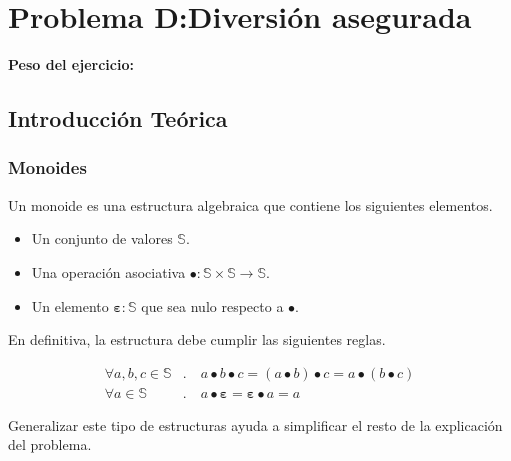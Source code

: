 \newpage{}
\section{Problema D:\@ Diversión asegurada}
\textbf{Peso del ejercicio: }

\newcommand{\mempty}{\mathbf{\varepsilon}}

\subsection{Introducción Teórica}

\subsubsection{Monoides}

Un monoide es una estructura algebraica que contiene los siguientes elementos.

\begin{itemize}
	\item Un conjunto de valores \(\mathbb{S}\).
	\item Una operación asociativa \(\bullet : \mathbb{S} \times \mathbb{S} \rightarrow \mathbb{S}\).
	\item Un elemento \(\mempty : \mathbb{S}\) que sea nulo respecto a \(\bullet\).
\end{itemize}

En definitiva, la estructura debe cumplir las siguientes reglas.

\[
\begin{aligned}
	\forall a, b, c \in \mathbb{S}&. \quad a \bullet b \bullet c = (a \bullet b) \bullet c = a \bullet (b \bullet c) \\
	\forall a \in \mathbb{S}&. \quad a \bullet \mempty = \mempty \bullet a = a
\end{aligned}
\]

Generalizar este tipo de estructuras ayuda a simplificar el resto de la explicación del problema.
